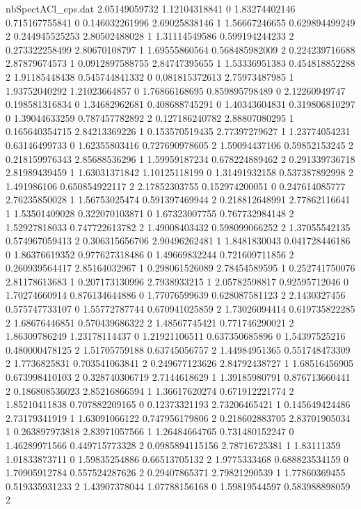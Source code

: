 \begin{filecontents}{nbSpectACl_eps.dat}
2.05149059732 1.12104318841 0
1.83274402146 0.715167755841 0
0.146032261996 2.69025838146 1
1.56667246655 0.629894499249 2
0.244945525253 2.80502488028 1
1.31114549586 0.599194244233 2
0.273322258499 2.80670108797 1
1.69555860564 0.568485982009 2
0.224239716688 2.87879674573 1
0.0912897588755 2.84747395655 1
1.53336951383 0.454818852288 2
1.91185448438 0.545744841332 0
0.081815372613 2.75973487985 1
1.93752040292 1.21023664857 0
1.76866168695 0.859895798489 0
2.12260949747 0.198581316834 0
1.34682962681 0.408688745291 0
1.40343604831 0.319806810297 0
1.39044633259 0.787457782892 2
0.127186240782 2.88807080295 1
0.165640354715 2.84213369226 1
0.153570519435 2.77397279627 1
1.23774054231 0.63146499733 0
1.62355803416 0.727690978605 2
1.59094437106 0.59852153245 2
0.218159976343 2.85688536296 1
1.59959187234 0.678224889462 2
0.291339736718 2.81989439459 1
1.63031371842 1.10125118199 0
1.31491932158 0.537387892998 2
1.491986106 0.650854922117 2
2.17852303755 0.152974200051 0
0.247614085777 2.76235850028 1
1.56753025474 0.591397469944 2
0.218812648991 2.77862116641 1
1.53501409028 0.322070103871 0
1.67323007755 0.767732984148 2
1.52927818033 0.747722613782 2
1.49008403432 0.598099066252 2
1.37055542135 0.574967059413 2
0.306315656706 2.90496262481 1
1.8481830043 0.041728446186 0
1.86376619352 0.977627318486 0
1.49669832244 0.721609711856 2
0.260939564417 2.85164032967 1
0.298061526089 2.78454589595 1
0.252741750076 2.81178613683 1
0.207173130996 2.7938933215 1
2.05782598817 0.92595712046 0
1.70274660914 0.876134644886 0
1.77076599639 0.628087581123 2
2.1430327456 0.575747733107 0
1.55772787744 0.670941025859 2
1.73026094414 0.619735822285 2
1.68676446851 0.570439686322 2
1.48567745421 0.771746290021 2
1.86309786249 1.23178114437 0
1.21921106511 0.637350685896 0
1.54397525216 0.480000478125 2
1.51705759188 0.63745056757 2
1.44984951365 0.551748473309 2
1.7736825831 0.703541063841 2
0.249677123626 2.84792438727 1
1.68516456905 0.673998410103 2
0.328740306719 2.7144618629 1
1.39185980791 0.876713660441 2
0.186808536023 2.85216866594 1
1.36617620274 0.671912221774 2
1.85210411838 0.707882209165 0
0.12373321193 2.73206465421 1
0.145649424486 2.73179341919 1
1.63091066122 0.747956179806 2
0.218602883705 2.83701905034 1
0.263897973818 2.83971057566 1
1.26484664765 0.731480152247 0
1.46289971566 0.449715773328 2
0.0985894115156 2.78716725381 1
1.83111359 1.01833873711 0
1.59835254886 0.66513705132 2
1.9775333468 0.688823534159 0
1.70905912784 0.557524287626 2
0.29407865371 2.79821290539 1
1.77860369455 0.519335931233 2
1.43907378044 1.07788156168 0
1.59819544597 0.583988898059 2

\end{filecontents}
